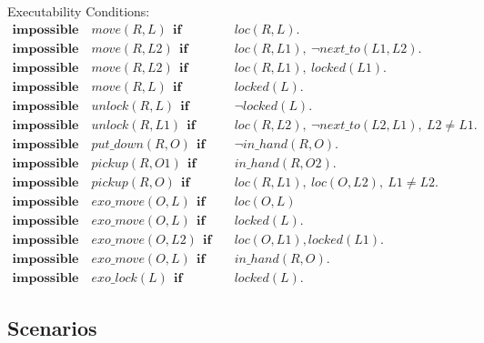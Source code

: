 \documentclass[11pt, oneside]{article}
\begin{document}
Executability Conditions:
\begin{align*}
  \mathbf{impossible}\quad move(R, L)~~\mathbf{if}&\quad loc(R,L).\\
  \mathbf{impossible}\quad move(R, L2)~~\mathbf{if}&\quad loc(R,L1),~\neg next\_to(L1,L2).\\
  \mathbf{impossible}\quad move(R,L2)~~\mathbf{if}&\quad loc(R,L1),~locked(L1).\\
  \mathbf{impossible}\quad move(R,L)~~\mathbf{if}&\quad locked(L).\\
  \mathbf{impossible}\quad unlock(R, L)~~\mathbf{if}&\quad \neg locked(L).\\
  \mathbf{impossible}\quad unlock(R, L1)~~\mathbf{if}&\quad loc(R,L2),~\neg next\_to(L2,L1),~L2\neq L1.\\
  \mathbf{impossible}\quad put\_down(R,O)~~\mathbf{if}&\quad \neg in\_hand(R,O).\\
  \mathbf{impossible}\quad pickup(R,O1)~~\mathbf{if}&\quad in\_hand(R,O2).\\
  \mathbf{impossible}\quad pickup(R,O)~~\mathbf{if}&\quad loc(R,L1),~loc(O,L2),~L1 \neq L2.\\
  \mathbf{impossible}\quad exo\_move(O,L)~~\mathbf{if}&\quad loc(O,L)\\
  \mathbf{impossible}\quad exo\_move(O,L)~~\mathbf{if}&\quad locked(L).\\
  \mathbf{impossible}\quad exo\_move(O,L2)~~\mathbf{if}&\quad loc(O,L1), locked(L1).\\
  \mathbf{impossible}\quad exo\_move(O,L)~~\mathbf{if}&\quad in\_hand(R,O).\\
  \mathbf{impossible}\quad exo\_lock(L)~~\mathbf{if}&\quad locked(L).
\end{align*}

			  				 			  	 			             


\subsection{Scenarios}
\end{document}
